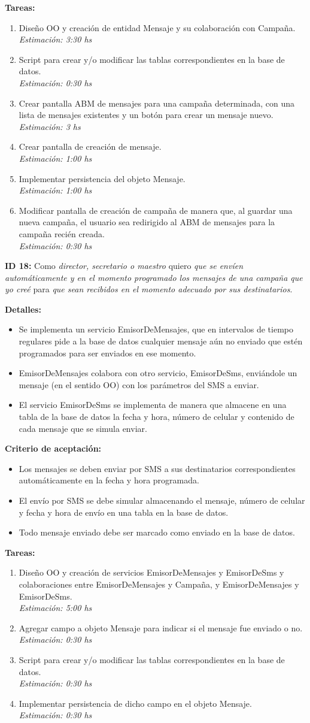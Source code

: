 \documentclass[a4paper, 10pt, twoside]{article}
\newcommand{\sprintstory}[4]{
  \noindent
  \textbf{ID #1:} Como \emph{#2} quiero \emph{#3} para \emph{#4}.
}
\newenvironment{detalles}{
  \textbf{Detalles:}
  \begin{itemize}
}{
  \end{itemize}
}
\newcommand{\detalle}[1] {
  \item #1.
}
\newenvironment{criterios}{
  \textbf{Criterio de aceptación:}
  \begin{itemize}
}{
  \end{itemize}
}
\newcommand{\criterio}[1] {
  \item #1
}
\newenvironment{tasks}{
  \textbf{Tareas:}
  \begin{enumerate}
}{
  \end{enumerate}
}
\newcommand{\task}[2] {
  \item #1.\\
  \emph{Estimación: #2 hs}
}
\begin{document}
\begin{tasks}
  \task{Diseño OO y creación de entidad Mensaje y su colaboración con Campaña}{3:30}
  \task{Script para crear y/o modificar las tablas correspondientes en la base de datos}{0:30}
  \task{Crear pantalla ABM de mensajes para una campaña determinada, con una lista de mensajes existentes y un botón para crear un mensaje nuevo}{3}
  \task{Crear pantalla de creación de mensaje}{1:00}
  \task{Implementar persistencia del objeto Mensaje}{1:00}
  \task{Modificar pantalla de creación de campaña de manera que, al guardar una nueva campaña, el usuario sea redirigido al ABM de mensajes para la campaña recién creada}{0:30}
\end{tasks}

\sprintstory{18}
            {director, secretario o maestro}
            {que se envíen automáticamente y en el momento programado los mensajes de una campaña que yo creé}
            {que sean recibidos en el momento adecuado por sus destinatarios}

\begin{detalles}
  \detalle{Se implementa un servicio EmisorDeMensajes, que en intervalos de tiempo regulares pide a la base de datos cualquier mensaje aún no enviado que estén programados para ser enviados en ese momento}
  \detalle{EmisorDeMensajes colabora con otro servicio, EmisorDeSms, enviándole un mensaje (en el sentido OO) con los parámetros del SMS a enviar}
  \detalle{El servicio EmisorDeSms se implementa de manera que almacene en una tabla de la base de datos la fecha y hora, número de celular y contenido de cada mensaje que se simula enviar}
\end{detalles}

\begin{criterios}
  \criterio{Los mensajes se deben enviar por SMS a sus destinatarios correspondientes automáticamente en la fecha y hora programada.}
  \criterio{El envío por SMS se debe simular almacenando el mensaje, número de celular y fecha y hora de envío en una tabla en la base de datos.}
  \criterio{Todo mensaje enviado debe ser marcado como enviado en la base de datos.}
\end{criterios}

\begin{tasks}
  \task{Diseño OO y creación de servicios EmisorDeMensajes y EmisorDeSms y colaboraciones entre EmisorDeMensajes y Campaña, y EmisorDeMensajes y EmisorDeSms}{5:00}
  \task{Agregar campo a objeto Mensaje para indicar si el mensaje fue enviado o no}{0:30}
  \task{Script para crear y/o modificar las tablas correspondientes en la base de datos}{0:30}
  \task{Implementar persistencia de dicho campo en el objeto Mensaje}{0:30}
\end{tasks}
\end{document}
